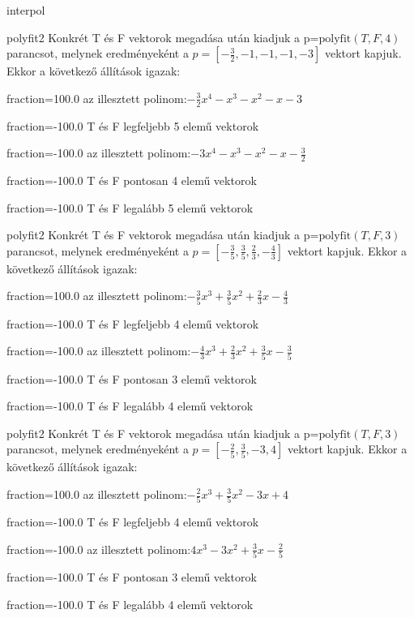 \documentclass[12pt]{article}
\begin{document}
\begin{quiz}{interpol}
\begin{multi}[multiple]{polyfit2}
Konkrét T és F vektorok megadása után kiadjuk a p=$\mathrm{polyfit}(T,F,4)$
parancsot, melynek eredményeként a $p=\left[-\frac{3}{2},-1,-1,-1,-3\right]$ vektort kapjuk.
Ekkor a következő állítások igazak:
\item[fraction=100.0] az illesztett polinom:$-\frac{3}{2}x^4-x^3-x^2-x-3$
\item[fraction=-100.0]  T és F legfeljebb 5 elemű vektorok
\item[fraction=-100.0]  az illesztett polinom:$-3x^4-x^3-x^2-x-\frac{3}{2}$
\item[fraction=-100.0]  T és F pontosan 4 elemű vektorok
\item[fraction=-100.0] T és F legalább 5 elemű vektorok
\end{multi}
\begin{multi}[multiple]{polyfit2}
Konkrét T és F vektorok megadása után kiadjuk a p=$\mathrm{polyfit}(T,F,3)$
parancsot, melynek eredményeként a $p=\left[-\frac{3}{5},\frac{3}{5},\frac{2}{3},-\frac{4}{3}\right]$ vektort kapjuk.
Ekkor a következő állítások igazak:
\item[fraction=100.0] az illesztett polinom:$-\frac{3}{5}x^3+\frac{3}{5}x^2+\frac{2}{3}x-\frac{4}{3}$
\item[fraction=-100.0]  T és F legfeljebb 4 elemű vektorok
\item[fraction=-100.0]  az illesztett polinom:$-\frac{4}{3}x^3+\frac{2}{3}x^2+\frac{3}{5}x-\frac{3}{5}$
\item[fraction=-100.0]  T és F pontosan 3 elemű vektorok
\item[fraction=-100.0] T és F legalább 4 elemű vektorok
\end{multi}
\begin{multi}[multiple]{polyfit2}
Konkrét T és F vektorok megadása után kiadjuk a p=$\mathrm{polyfit}(T,F,3)$
parancsot, melynek eredményeként a $p=\left[-\frac{2}{5},\frac{3}{5},-3,4\right]$ vektort kapjuk.
Ekkor a következő állítások igazak:
\item[fraction=100.0] az illesztett polinom:$-\frac{2}{5}x^3+\frac{3}{5}x^2-3x+4$
\item[fraction=-100.0]  T és F legfeljebb 4 elemű vektorok
\item[fraction=-100.0]  az illesztett polinom:$4x^3-3x^2+\frac{3}{5}x-\frac{2}{5}$
\item[fraction=-100.0]  T és F pontosan 3 elemű vektorok
\item[fraction=-100.0] T és F legalább 4 elemű vektorok

\end{multi}
\end{quiz}
\end{document}

